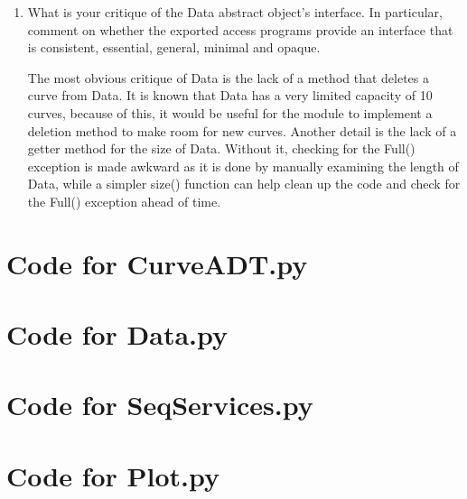\documentclass[12pt]{article}
\begin{document}
\begin{enumerate}
\item What is your critique of the Data abstract object's interface.  In
  particular, comment on whether the exported access programs provide an
  interface that is consistent, essential, general, minimal and opaque.

 The most obvious critique of Data is the lack of a method that deletes a
 curve from Data. It is known that Data has a very limited capacity of 10 
 curves, because of this, it would be useful for the module to implement a 
 deletion method to make room for new curves. Another detail is the lack of 
 a getter method for the size of Data. Without it, checking for the Full() 
 exception is made awkward as it is done by manually examining the length
 of Data, while a simpler size() function can help clean up the code and check
 for the Full() exception ahead of time.

\end{enumerate}

\newpage

\lstset{language=Python, basicstyle=\tiny, breaklines=true, showspaces=false,
  showstringspaces=false, breakatwhitespace=true}

\def\thesection{\Alph{section}}

\section{Code for CurveADT.py}

\noindent 

\newpage

\section{Code for Data.py}

\noindent 

\newpage

\section{Code for SeqServices.py}

\noindent 

\newpage

\section{Code for Plot.py}
\end{document}
